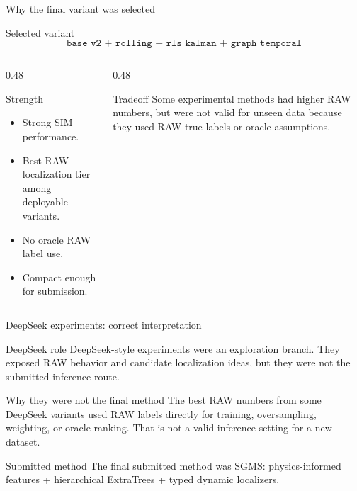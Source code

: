 \documentclass[10pt,aspectratio=169]{beamer}
\begin{document}
\begin{frame}{Why the final variant was selected}
\small
\begin{block}{Selected variant}
\[
\texttt{base\_v2 + rolling + rls\_kalman + graph\_temporal}
\]
\end{block}
\begin{columns}[T,totalwidth=\textwidth]
\begin{column}{0.48\textwidth}
\begin{exampleblock}{Strength}
\begin{itemize}
  \item Strong SIM performance.
  \item Best RAW localization tier among deployable variants.
  \item No oracle RAW label use.
  \item Compact enough for submission.
\end{itemize}
\end{exampleblock}
\end{column}
\begin{column}{0.48\textwidth}
\begin{alertblock}{Tradeoff}
Some experimental methods had higher RAW numbers, but were not valid for unseen data because they used RAW true labels or oracle assumptions.
\end{alertblock}
\end{column}
\end{columns}
\end{frame}

\begin{frame}{DeepSeek experiments: correct interpretation}
\small
\begin{block}{DeepSeek role}
DeepSeek-style experiments were an exploration branch. They exposed RAW behavior and candidate localization ideas, but they were not the submitted inference route.
\end{block}
\begin{alertblock}{Why they were not the final method}
The best RAW numbers from some DeepSeek variants used RAW labels directly for training, oversampling, weighting, or oracle ranking. That is not a valid inference setting for a new dataset.
\end{alertblock}
\begin{exampleblock}{Submitted method}
The final submitted method was SGMS: physics-informed features + hierarchical ExtraTrees + typed dynamic localizers.
\end{exampleblock}
\end{frame}
\end{document}

